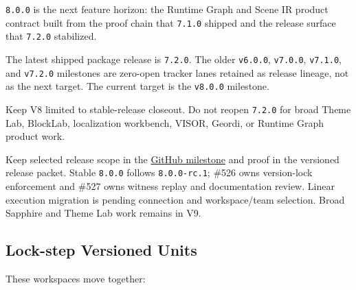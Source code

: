 \texttt{8\allowbreak{}.\allowbreak{}0\allowbreak{}.\allowbreak{}0} is the next feature horizon: the Runtime Graph and Scene IR product contract built from the proof chain that \texttt{7\allowbreak{}.\allowbreak{}1\allowbreak{}.\allowbreak{}0} shipped and the release surface that \texttt{7\allowbreak{}.\allowbreak{}2\allowbreak{}.\allowbreak{}0} stabilized.

The latest shipped package release is \texttt{7\allowbreak{}.\allowbreak{}2\allowbreak{}.\allowbreak{}0}. The older \texttt{v\allowbreak{}6\allowbreak{}.\allowbreak{}0\allowbreak{}.\allowbreak{}0}, \texttt{v\allowbreak{}7\allowbreak{}.\allowbreak{}0\allowbreak{}.\allowbreak{}0}, \texttt{v\allowbreak{}7\allowbreak{}.\allowbreak{}1\allowbreak{}.\allowbreak{}0}, and \texttt{v\allowbreak{}7\allowbreak{}.\allowbreak{}2\allowbreak{}.\allowbreak{}0} milestones are zero-open tracker lanes retained as release lineage, not as the next target. The current target is the \texttt{v\allowbreak{}8\allowbreak{}.\allowbreak{}0\allowbreak{}.\allowbreak{}0} milestone.

Keep V8 limited to stable-release closeout. Do not reopen \texttt{7\allowbreak{}.\allowbreak{}2\allowbreak{}.\allowbreak{}0} for broad Theme Lab, BlockLab, localization workbench, VISOR, Geordi, or Runtime Graph product work.

Keep selected release scope in the \href{https://github.com/flyingrobots/bijou/milestone/6}{GitHub milestone} and proof in the versioned release packet. Stable \texttt{8\allowbreak{}.\allowbreak{}0\allowbreak{}.\allowbreak{}0} follows \texttt{8\allowbreak{}.\allowbreak{}0\allowbreak{}.\allowbreak{}0\allowbreak{}-\allowbreak{}r\allowbreak{}c\allowbreak{}.\allowbreak{}1}; \#526 owns version-lock enforcement and \#527 owns witness replay and documentation review. Linear execution migration is pending connection and workspace/team selection. Broad Sapphire and Theme Lab work remains in V9.

\subsection{Lock-step Versioned Units}\label{record-274-lock-step-versioned-units}

These workspaces move together:

